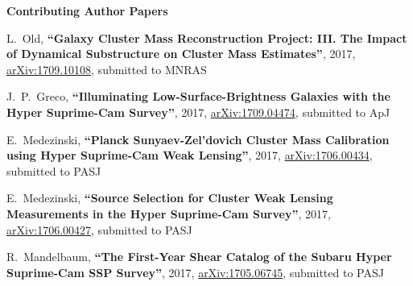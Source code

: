 \documentclass{article}
\def\myself{\textbf{\color{red} C.~Sif\'on}}
\def\apj{ApJ}
\def\mnras{MNRAS}
\def\pasj{PASJ}
\newcommand{\submitted}[1]{submitted to #1}
\newcommand{\paper}[1]{\textbf{``#1''}}
\begin{document}


\vspace{0.4cm}
\noindent
{\bf\Large Contributing Author Papers}\\

\vspace{-0.5cm}
\begin{etaremune}

\item

L.~Old, 
\paper{Galaxy Cluster Mass Reconstruction Project: III. The Impact of Dynamical 
Substructure on Cluster Mass Estimates},
2017, \href{http://adsabs.harvard.edu/abs/2017arXiv170910108O}{arXiv:1709.10108},
\submitted{\mnras}

\item
J.~P.~Greco, 
\paper{Illuminating Low-Surface-Brightness Galaxies with the Hyper Suprime-Cam 
Survey},
2017, \href{http://adsabs.harvard.edu/abs/2017arXiv170904474G}{arXiv:1709.04474},
\submitted{\apj}

\item
E.~Medezinski, 
\paper{Planck Sunyaev-Zel'dovich Cluster Mass Calibration using Hyper 
Suprime-Cam Weak Lensing},
2017, \href{http://adsabs.harvard.edu/abs/2017arXiv170600434M}{arXiv:1706.00434},
\submitted{\pasj}

\item
E.~Medezinski, 
\paper{Source Selection for Cluster Weak Lensing Measurements in the Hyper Suprime-Cam
Survey},
2017, \href{http://adsabs.harvard.edu/abs/2017arXiv170600427M}{arXiv:1706.00427},
\submitted{\pasj}

\item
R.~Mandelbaum, 
\paper{The First-Year Shear Catalog of the Subaru Hyper Suprime-Cam SSP Survey},
2017, \href{http://adsabs.harvard.edu/abs/2017arXiv170506745M}{arXiv:1705.06745},
\submitted{\pasj}


\end{etaremune}
\end{document}
